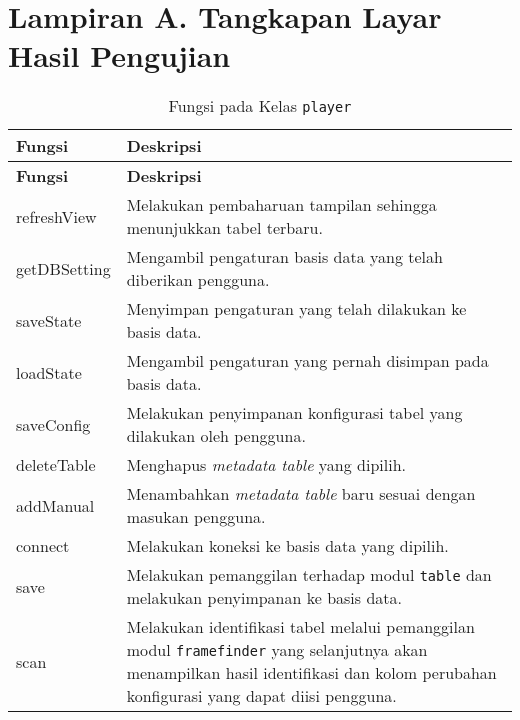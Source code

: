 \chapter{Lampiran A. Tangkapan Layar Hasil Pengujian}

\begin{small}
\begin{longtable}{ | p{2cm} | p{10cm} | }
    \caption{Fungsi pada Kelas \texttt{player}}
    \label{FungsiModulPlayer}\\ \hline
    \centering\bfseries{Fungsi} & \centering\bfseries{Deskripsi} \tabularnewline \hline
    \endfirsthead
    \hline
    \centering\bfseries{Fungsi} & \centering\bfseries{Deskripsi} \tabularnewline \hline
    \endhead
    refreshView & Melakukan pembaharuan tampilan sehingga menunjukkan tabel terbaru.\\ \hline
    getDBSetting & Mengambil pengaturan basis data yang telah diberikan pengguna.\\ \hline
    saveState & Menyimpan pengaturan yang telah dilakukan ke basis data.\\ \hline
    loadState & Mengambil pengaturan yang pernah disimpan pada basis data.\\ \hline
    saveConfig & Melakukan penyimpanan konfigurasi tabel yang dilakukan oleh pengguna. \\ \hline
    deleteTable & Menghapus \textit{metadata table} yang dipilih.\\ \hline
    addManual & Menambahkan \textit{metadata table} baru sesuai dengan masukan pengguna.\\ \hline
    connect & Melakukan koneksi ke basis data yang dipilih. \\ \hline
    save & Melakukan pemanggilan terhadap modul \texttt{table} dan melakukan penyimpanan ke basis data. \\ \hline
    scan & Melakukan identifikasi tabel melalui pemanggilan modul \texttt{framefinder} yang selanjutnya akan menampilkan hasil identifikasi dan kolom perubahan konfigurasi yang dapat diisi pengguna. \\ \hline
\end{longtable}
\end{small}

